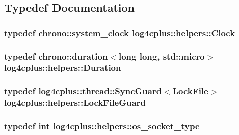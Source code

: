 \subsection{Typedef Documentation}
\hypertarget{namespacelog4cplus_1_1helpers_a9271a4862d21d1ec6e02b5d511bca6ae}{
\subsubsection[{Clock}]{\setlength{\rightskip}{0pt plus 5cm}typedef chrono\-::system\-\_\-clock {\bf log4cplus\-::helpers\-::\-Clock}}}\label{namespacelog4cplus_1_1helpers_a9271a4862d21d1ec6e02b5d511bca6ae}
\hypertarget{namespacelog4cplus_1_1helpers_a91aca34282a0dda3ca8568ccaa60950c}{
\subsubsection[{Duration}]{\setlength{\rightskip}{0pt plus 5cm}typedef chrono\-::duration$<$long long, std\-::micro$>$ {\bf log4cplus\-::helpers\-::\-Duration}}}\label{namespacelog4cplus_1_1helpers_a91aca34282a0dda3ca8568ccaa60950c}
\hypertarget{namespacelog4cplus_1_1helpers_adf94dab7f623b7d4d8e7eb2eba4e86bd}{
\subsubsection[{Lock\-File\-Guard}]{\setlength{\rightskip}{0pt plus 5cm}typedef {\bf log4cplus\-::thread\-::\-Sync\-Guard}$<${\bf Lock\-File}$>$ {\bf log4cplus\-::helpers\-::\-Lock\-File\-Guard}}}\label{namespacelog4cplus_1_1helpers_adf94dab7f623b7d4d8e7eb2eba4e86bd}
\hypertarget{namespacelog4cplus_1_1helpers_a74064c46dd7651c68c1f58b73a1b14ca}{
\subsubsection[{os\-\_\-socket\-\_\-type}]{\setlength{\rightskip}{0pt plus 5cm}typedef int {\bf log4cplus\-::helpers\-::os\-\_\-socket\-\_\-type}}}\label{namespacelog4cplus_1_1helpers_a74064c46dd7651c68c1f58b73a1b14ca}
